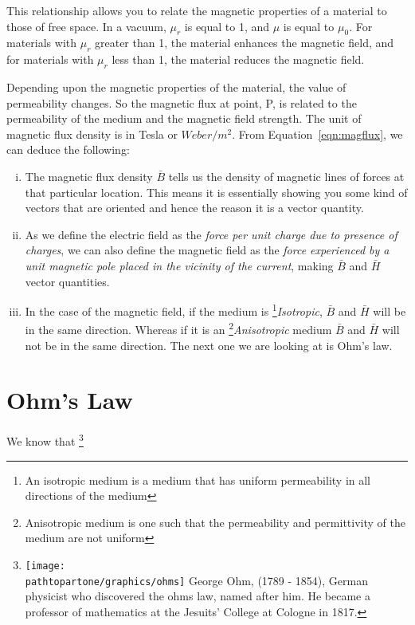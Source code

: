 This relationship allows you to relate the magnetic properties of a material to those of free space. In a vacuum, \( \mu_r \) is equal to 1, and \( \mu \) is equal to \( \mu_0 \). For materials with \( \mu_r \) greater than 1, the material enhances the magnetic field, and for materials with \( \mu_r \) less than 1, the material reduces the magnetic field.

Depending upon the magnetic properties of the material, the value of permeability changes. So the magnetic flux at point, P, is related to the permeability of the medium and the magnetic field strength. The unit of magnetic flux density is in Tesla or $Weber/m^{2}$.
From Equation~\eqref{eqn:magflux}, we can deduce the following:
\begin{enumerate}[(i)]
\item The magnetic flux density $\bar{B}$ tells us the density of magnetic lines of forces at that particular location. This means it is essentially showing you some kind of vectors that are oriented and hence the reason it is a vector quantity.
\item As we define the electric field as the \emph{force per unit charge due to presence of charges}, we can also define the magnetic field as the \emph{force experienced by a unit magnetic pole placed in the vicinity of the current}, making $\bar{B}$ and $\bar{H}$ vector quantities.
\item In the case of the magnetic field, if the medium is \footnote[2]{An isotropic medium is a medium that has uniform permeability in all directions of the medium }\emph{Isotropic}, $\bar{B}$ and $\bar{H}$ will be in the same direction. Whereas if it is an \footnote[3]{Anisotropic medium is one such that the permeability and permittivity of the medium are not uniform }\emph{Anisotropic} medium $\bar{B}$ and $\bar{H}$ will not be in the same direction. The next one we are looking at is Ohm's law.
\end{enumerate}

\section{Ohm's Law} 
We know that 
\footnote[4]{
\texttt{[image: \\pathtopartone/graphics/ohms]} 
George Ohm, (1789 - 1854), German physicist who discovered the ohms law, named after him. He became a professor of mathematics at the Jesuits’ College at Cologne in 1817.
}

